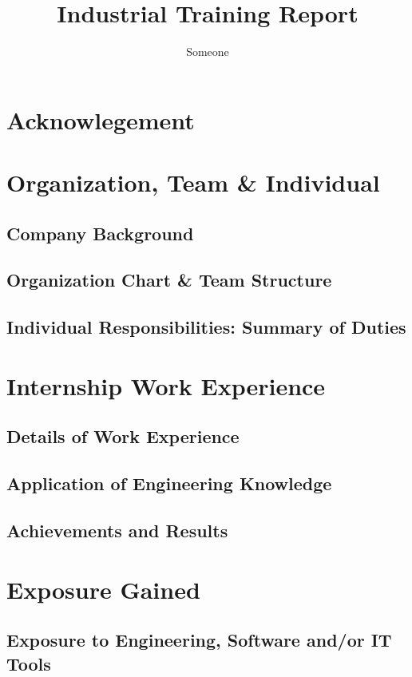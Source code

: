\documentclass{article}[12pt]
\title{Industrial Training Report}
\author{Someone}
\begin{document}
\maketitle

\section*{Acknowlegement}

\clearpage
\tableofcontents

\clearpage
\section{Organization, Team \& Individual}
\subsection{Company Background}
\subsection{Organization Chart \& Team Structure}
\subsection{Individual Responsibilities: Summary of Duties}

\clearpage
\section{Internship Work Experience}
\subsection{Details of Work Experience}
\subsection{Application of Engineering Knowledge}
\subsection{Achievements and Results}

\clearpage
\section{Exposure Gained}
\subsection{Exposure to Engineering, Software and/or IT Tools}
\end{document}
